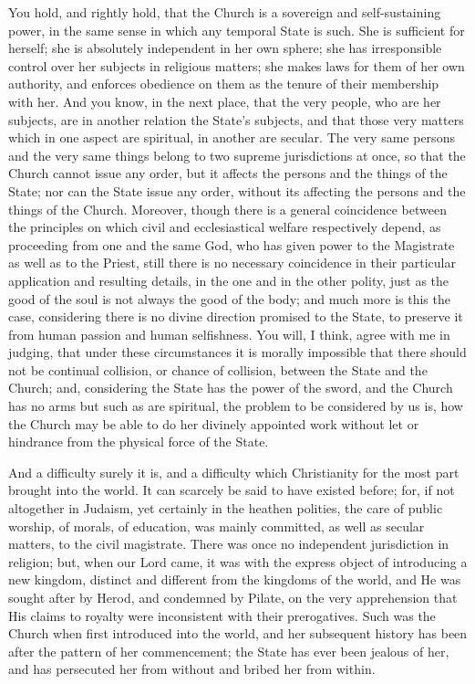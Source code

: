You hold, and rightly hold, that the Church is a sovereign and
self-sustaining power, in the same sense in which any temporal State
is such. She is sufficient for herself; she is absolutely independent
in her own sphere; she has irresponsible control over her subjects in
religious matters; she makes laws for them of her own authority, and
enforces obedience on them as the tenure of their membership with her.
And you know, in the next place, that the very people, who are her
subjects, are in another relation the State's subjects, and that those
very matters which in one aspect are spiritual, in another are
secular. The very same persons and the very same things belong to two
supreme jurisdictions at once, so that the Church cannot issue any
order, but it affects the persons and the things of the State; nor can
the State issue any order, without its affecting the persons and the
things of the Church. Moreover, though there is a general coincidence
between the principles on which civil and ecclesiastical welfare
respectively depend, as proceeding from one and the same God, who has
given power to the Magistrate as well as to the Priest, still there is
no necessary coincidence in their particular application and resulting
details, in the one and in the other polity, just as the good of the
soul is not always the good of the body; and much more is this the
case, considering there is no divine direction promised to the State,
to preserve it from human passion and human selfishness. You will, I
think, agree with me in judging, that under these circumstances it is
morally impossible that there should not be continual collision, or
chance of collision, between the State and the Church; and,
considering the State has the power of the sword, and the Church has
no arms but such as are spiritual, the problem to be considered by us
is, how the Church may be able to do her divinely appointed work
without let or hindrance from the physical force of the State.

And a difficulty surely it is, and a difficulty which Christianity
for the most part brought into the world. It can scarcely be said to
have existed before; for, if not altogether in Judaism, yet certainly
in the heathen polities, the care of public worship, of morals, of
education, was mainly committed, as well as secular matters, to the
civil magistrate. There was once no independent jurisdiction in
religion; but, when our Lord came, it was with the express object of
introducing a new kingdom, distinct and different from the kingdoms of
the world, and He was sought after by Herod, and condemned by Pilate,
on the very apprehension that His claims to royalty were inconsistent
with their prerogatives. Such was the Church when first introduced
into the world, and her subsequent history has been after the pattern
of her commencement; the State has ever been jealous of her, and has
persecuted her from without and bribed her from within.

